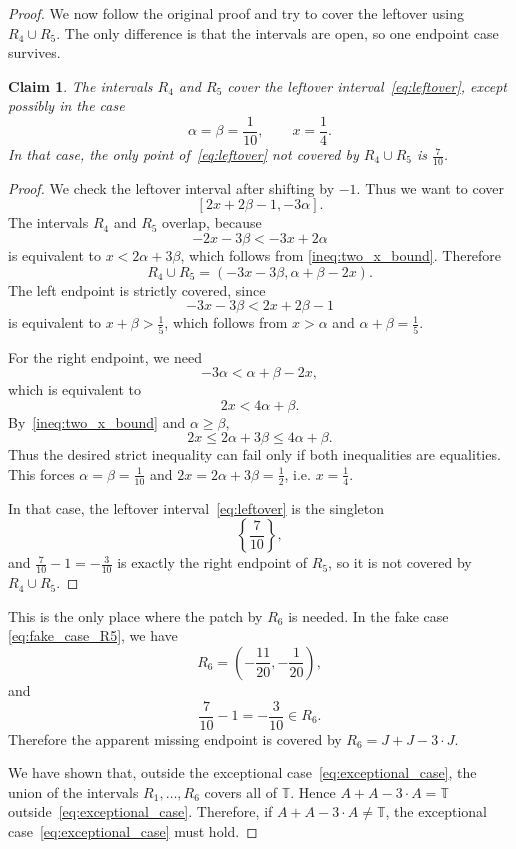\documentclass{article}
\newtheorem{claim}{Claim}
\begin{document}
\begin{proof}
We now follow the original proof and try to cover the leftover using $R_4\cup R_5$.
The only difference is that the intervals are open, so one endpoint case survives.

\begin{claim}\label{claim:R4_R5_cover_except_fake}
The intervals $R_4$ and $R_5$ cover the leftover interval~\eqref{eq:leftover}, except
possibly in the case
\begin{equation}\label{eq:fake_case_R5}
    \alpha=\beta=\frac1{10}, \qquad x=\frac14.
\end{equation}
In that case, the only point of~\eqref{eq:leftover} not covered by $R_4\cup R_5$ is
$\frac7{10}$.
\end{claim}

\begin{proof}
We check the leftover interval after shifting by $-1$. Thus we want to cover
\[
    [2x+2\beta-1,-3\alpha].
\]
The intervals $R_4$ and $R_5$ overlap, because
\[
    -2x-3\beta<-3x+2\alpha
\]
is equivalent to $x<2\alpha+3\beta$, which follows from
\eqref{ineq:two_x_bound}. Therefore
\[
    R_4\cup R_5=(-3x-3\beta,\alpha+\beta-2x).
\]
The left endpoint is strictly covered, since
\[
    -3x-3\beta<2x+2\beta-1
\]
is equivalent to $x+\beta>\frac15$, which follows from $x>\alpha$ and
$\alpha+\beta=\frac15$.

For the right endpoint, we need
\[
    -3\alpha<\alpha+\beta-2x,
\]
which is equivalent to
\[
    2x<4\alpha+\beta.
\]
By~\eqref{ineq:two_x_bound} and $\alpha\geq\beta$,
\[
    2x\leq 2\alpha+3\beta\leq 4\alpha+\beta.
\]
Thus the desired strict inequality can fail only if both inequalities are equalities.
This forces $\alpha=\beta=\frac1{10}$ and $2x=2\alpha+3\beta=\frac12$, i.e.
$x=\frac14$.

In that case, the leftover interval~\eqref{eq:leftover} is the singleton
\[
    \left\{\frac7{10}\right\},
\]
and $\frac7{10}-1=-\frac3{10}$ is exactly the right endpoint of $R_5$, so it is not
covered by $R_4\cup R_5$.
\end{proof}

This is the only place where the patch by $R_6$ is needed. In the fake case
\eqref{eq:fake_case_R5}, we have
\[
    R_6=\left(-\frac{11}{20},-\frac1{20}\right),
\]
and
\[
    \frac7{10}-1=-\frac3{10}\in R_6.
\]
Therefore the apparent missing endpoint is covered by $R_6=J+J-3\cdot J$.

We have shown that, outside the exceptional case~\eqref{eq:exceptional_case}, the union
of the intervals $R_1,\ldots,R_6$ covers all of $\mathbb T$. Hence
$A+A-3\cdot A=\mathbb T$ outside~\eqref{eq:exceptional_case}. Therefore, if
$A+A-3\cdot A\neq\mathbb T$, the exceptional case~\eqref{eq:exceptional_case} must hold.


\end{proof}
\end{document}
